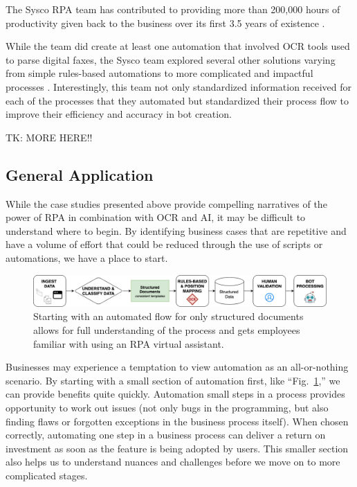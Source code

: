 \documentclass[conference, draftcls]{IEEEtran}
\begin{document}
The Sysco RPA team has contributed to providing more than 200,000 hours of productivity given back to the business over its first 3.5 years of existence \cite{bpcafe2021sysco:slides}.

While the team did create at least one automation that involved OCR tools used to parse digital faxes, the Sysco team explored several other solutions varying from simple rules-based automations to more complicated and impactful processes \cite{bpcafe2021sysco}. Interestingly, this team not only standardized information received for each of the processes that they automated but standardized their process flow to improve their efficiency and accuracy in bot creation.

TK: MORE HERE!!

\subsection{General Application}
While the case studies presented above provide compelling narratives of the power of RPA in combination with OCR and AI, it may be difficult to understand where to begin. By identifying business cases that are repetitive and have a volume of effort that could be reduced through the use of scripts or automations, we have a place to start.

\begin{figure}[ht]
\centerline{\includegraphics[width=\columnwidth]{USE CASE - 1 - STRUCTURED.png}}
\caption{Starting with an automated flow for only structured documents allows for full understanding of the process and gets employees familiar with using an RPA virtual assistant.}
\label{figUseCase1}
\end{figure}

Businesses may experience a temptation to view automation as an all-or-nothing scenario. By starting with a small section of automation first, like ``Fig.~\ref{figUseCase1},'' we can provide benefits quite quickly. Automation small steps in a process provides opportunity to work out issues (not only bugs in the programming, but also finding flaws or forgotten exceptions in the business process itself). When chosen correctly, automating one step in a business process can deliver a return on investment as soon as the feature is being adopted by users. This smaller section also helps us to understand nuances and challenges before we move on to more complicated stages.
\end{document}
